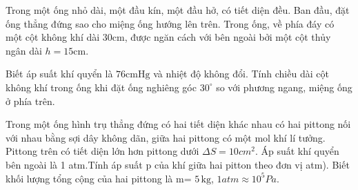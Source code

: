 \begin{ex}
Trong một ống nhỏ dài, một đầu kín, một đầu hở, có tiết diện đều. Ban đầu, đặt ống thẳng đứng sao cho miệng ống hướng lên trên. Trong ống, về phía đáy có một cột không khí dài $30\mathrm{cm}$, được ngăn cách với bên ngoài bởi một cột thủy ngân dài $h=15\mathrm{cm}$.

Biết áp suất khí quyển là $76\mathrm{cmHg}$ và nhiệt độ không đổi. Tính chiều dài cột không khí trong ống khi đặt ống nghiêng góc $30^\circ$ so với phương ngang, miệng ống ở phía trên.
\end{ex}

\begin{ex}
Trong một ống hình trụ thẳng đứng có hai tiết diện khác nhau có hai pittong nối với nhau bằng sợi dây không dãn, giữa hai pittong có một mol khí lí tưởng. Pittong trên có tiết diện lớn hơn pittong dưới $\Delta S=10{cm}^{2}$. Áp suất khí quyển bên ngoài là 1 atm.Tính áp suất p của khí giữa hai pitton theo đơn vị atm). Biết khối lượng tổng cộng của hai pittong là m= $5\,\text{kg}$, $1 atm\approx {10}^{5}Pa$.
\end{ex}

